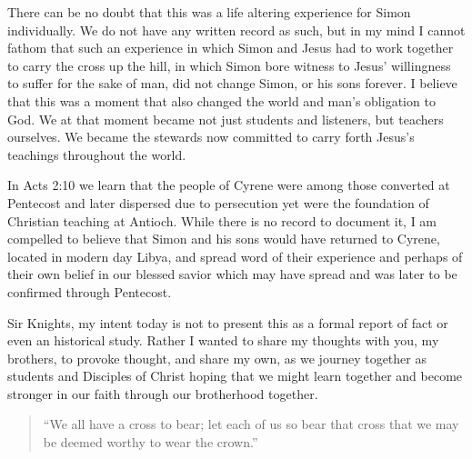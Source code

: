 \documentclass[letterpaper,11pt]{article}
\begin{document}
	There can be no doubt that this was a life altering experience for Simon individually.  We do not have any written record as such, but in my mind I cannot fathom that such an experience in which Simon and Jesus had to work together to carry the cross up the hill, in which Simon bore witness to Jesus' willingness to suffer for the sake of man, did not change Simon, or his sons forever.  I believe that this was a moment that also changed the world and man's obligation to God.  We at that moment became not just students and listeners, but teachers ourselves.  We became the stewards now committed to carry forth Jesus's teachings throughout the world.
	
	In Acts 2:10 we learn that the people of Cyrene were among those converted at Pentecost and later dispersed due to persecution yet were the foundation of Christian teaching at Antioch.  While there is no record to document it, I am compelled to believe that Simon and his sons would have returned to Cyrene, located in modern day Libya, and spread word of their experience and perhaps of their own belief in our blessed savior which may have spread and was later to be confirmed through Pentecost. 
	
	Sir Knights, my intent today is not to present this as a formal report of fact or even an historical study.  Rather I wanted to share my thoughts with you, my brothers, to provoke thought, and share my own, as we journey together as students and Disciples of Christ hoping that we might learn together and become stronger in our faith through our brotherhood together.
	
	\begin{quote}
		``We all have a cross to bear; let each of us so bear that cross that we may be deemed worthy to wear the crown.''
	\end{quote}
	
\end{document}
